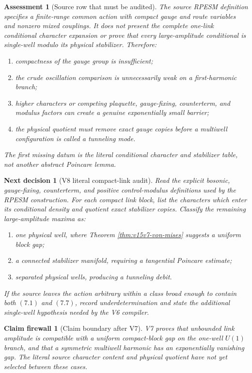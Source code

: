 \documentclass[11pt]{article}
\newtheorem{firewall}[theorem]{Claim firewall}
\newtheorem{decision}[theorem]{Next decision}
\newtheorem{assessment}[theorem]{Assessment}
\theoremstyle{remark}
\begin{document}
\begin{assessment}[Source row that must be audited]
\label{ass:v15v7-source}
The source RPESM definition specifies a finite-range common action
with compact gauge and route variables and nonzero mixed
couplings.  It does not present the complete one-link conditional
character expansion or prove that every large-amplitude
conditional is single-well modulo its physical stabilizer.
Therefore:
\begin{enumerate}
\item compactness of the gauge group is insufficient;
\item the crude oscillation comparison is unnecessarily weak on a
      first-harmonic branch;
\item higher characters or competing plaquette, gauge-fixing,
      counterterm, and modulus factors can create a genuine
      exponentially small barrier;
\item the physical quotient must remove exact gauge copies before
      a multiwell configuration is called a tunneling mode.
\end{enumerate}
The first missing datum is the literal conditional character and
stabilizer table, not another abstract Poincare lemma.
\end{assessment}

\begin{decision}[V8 literal compact-link audit]
\label{dec:v15v7-next}
Read the explicit bosonic, gauge-fixing, counterterm, and positive
control-modulus definitions used by the RPESM construction.
For each compact link block, list the characters which enter its
conditional density and quotient exact stabilizer copies.
Classify the remaining large-amplitude maxima as:
\begin{enumerate}
\item one physical well, where Theorem
      \ref{thm:v15v7-von-mises} suggests a uniform block gap;
\item a connected stabilizer manifold, requiring a tangential
      Poincare estimate;
\item separated physical wells, producing a tunneling debit.
\end{enumerate}
If the source leaves the action arbitrary within a class broad
enough to contain both \((7.1)\) and \((7.7)\), record
underdetermination and state the additional single-well hypothesis
needed by the V6 compiler.
\end{decision}

\begin{firewall}[Claim boundary after V7]
\label{fire:v15v7}
V7 proves that unbounded link amplitude is compatible with a
uniform compact-block gap on the one-well \(U(1)\) branch, and
that a symmetric multiwell harmonic has an exponentially vanishing
gap.  The literal source character content and physical quotient
have not yet selected between these cases.
\end{firewall}
\end{document}
